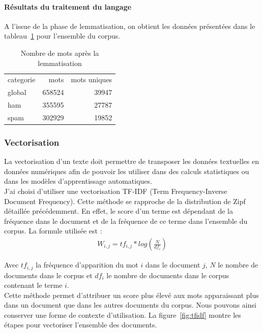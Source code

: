    \paragraph{Résultats du traitement du langage}
        A l'issue de la phase de lemmatisation, on obtient les données présentées dans le tableau~\ref{tab:nlp} pour l'ensemble du corpus.
        \begin{table}[H]
            \centering
            \begin{tabular}{l|rr}
                categorie & mots & mots uniques \\
                global & 658524 & 39947 \\
                \hline
                ham & 355595 & 27787 \\
                \hline
                spam & 302929 & 19852 \\
            \end{tabular}
            \caption{Nombre de mots après la lemmatisation}
            \label{tab:nlp}
        \end{table}

	\subsubsection{Vectorisation}
	    La vectorisation d'un texte doit permettre de transposer les données textuelles en données numériques afin de
        pouvoir les utiliser dans des calculs statistiques ou dans les modèles d'apprentissage automatiques.\\
		J'ai choisi d'utiliser une vectorisation TF-IDF\cite{ml-python} (Term Frequency-Inverse Document Frequency).
        Cette méthode se rapproche de la distribution de Zipf détaillée précédemment.
        En effet, le score d'un terme est dépendant de la fréquence dans le document et de la fréquence de ce terme dans l'ensemble du corpus.
        La formule utilisée est :
        \begin{align*}
            W_{i,j} = tf_{i,j}*log(\frac{N}{df_{i}})
        \end{align*}

        Avec $tf_{i,j}$ la fréquence d'apparition du mot $i$ dans le document $j$, $N$ le nombre de documents dans le corpus et $df_{i}$ le nombre de documents dans le corpus contenant le terme $i$. \\
        Cette méthode permet d'attribuer un score plus élevé aux mots apparaissant plus dans un document que dans les autres documents du corpus.
        Nous pouvons ainsi conserver une forme de contexte d'utilisation.
        La figure~\ref{fig:tfidf} montre les étapes pour vectoriser l'ensemble des documents.

